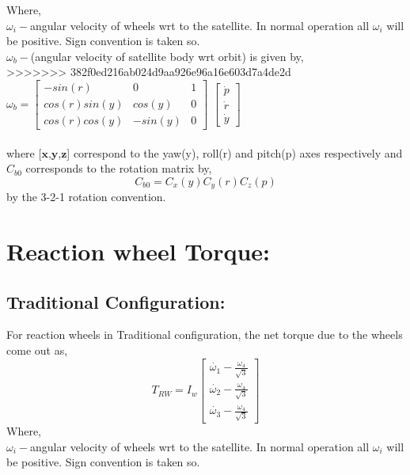 \documentclass[10pt,a4paper]{report}
\begin{document}
Where, \\
$\omega_{i}-$angular velocity of wheels wrt to the satellite. In normal operation all $\omega_{i}$ will be positive. Sign convention is taken so. \\
$ \omega_{b}- $(angular velocity of satellite body wrt orbit) is given by,\\
>>>>>>> 382f0ed216ab024d9aa926e96a16e603d7a4de2d
$
\omega_{b} =\begin{bmatrix}
-sin(r) & 0 & 1\\
cos(r) sin(y)&cos(y)&0\\
cos(r) cos(y)&-sin(y)&0
\end{bmatrix}
$ $
\begin{bmatrix}
\dot{p}\\ \dot{r} \\ \dot{y}
\end{bmatrix}
$\\ \\
where [$\textbf{x}$,$\textbf{y}$,$\textbf{z}$]  correspond to the yaw(y), roll(r) and pitch(p) axes respectively and $ C_{b0} $ corresponds to the rotation matrix by,
\begin{equation}
C_{b0}=C_{x}(y)C_{y}(r)C_{z}(p)
\end{equation}
by the 3-2-1 rotation convention.
\section{Reaction wheel Torque:}
\subsection{Traditional Configuration:}
For reaction wheels in Traditional configuration, the net torque due to the wheels come out as,
\begin{equation}
T_{RW}=I_{w}\begin{bmatrix}
\dot{\omega_{1}}-\frac{\omega_{4}}{\sqrt{3}}\\
\dot{\omega_{2}}-\frac{\omega_{4}}{\sqrt{3}}\\
\dot{\omega_{3}}-\frac{\omega_{4}}{\sqrt{3}}
\end{bmatrix}
\end{equation}
Where, \\
$\omega_{i}-$angular velocity of wheels wrt to the satellite. In normal operation all $\omega_{i}$ will be positive. Sign convention is taken so. \\

\newpage
\end{document}
